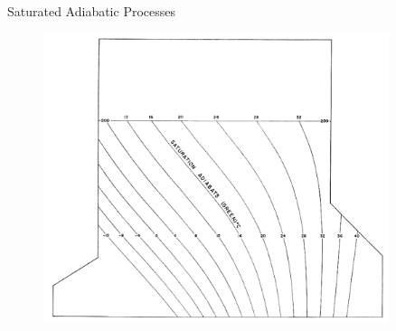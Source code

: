 \begin{frame}{Saturated Adiabatic Processes}
\begin{figure}
	\includegraphics[width=0.9\textwidth]{fig5}
\end{figure}
\end{frame}







